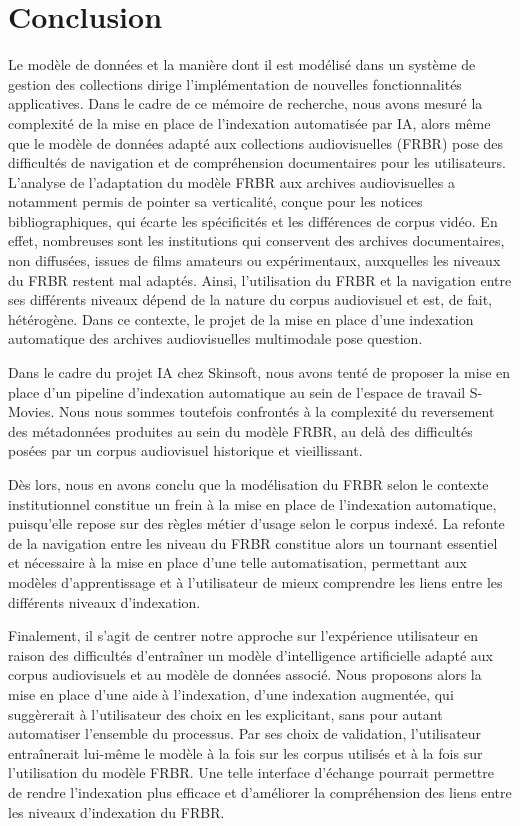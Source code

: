 \chapter*{Conclusion}

Le modèle de données et la manière dont il est modélisé dans un système de gestion des collections dirige l'implémentation de nouvelles fonctionnalités applicatives. Dans le cadre de ce mémoire de recherche, nous avons mesuré la complexité de la mise en place de l'indexation automatisée par IA, alors même que le modèle de données adapté aux collections audiovisuelles (FRBR) pose des difficultés de navigation et de compréhension documentaires pour les utilisateurs. 
L'analyse de l'adaptation du modèle FRBR aux archives audiovisuelles a notamment permis de pointer sa verticalité, conçue pour les notices bibliographiques, qui écarte les spécificités et les différences de corpus vidéo. En effet, nombreuses sont les institutions qui conservent des archives documentaires, non diffusées, issues de films amateurs ou expérimentaux, auxquelles les niveaux du FRBR restent mal adaptés. Ainsi, l'utilisation du FRBR et la navigation entre ses différents niveaux dépend de la nature du corpus audiovisuel et est, de fait, hétérogène.  Dans ce contexte, le projet de la mise en place d'une indexation automatique des archives audiovisuelles multimodale pose question.

Dans le cadre du projet IA chez Skinsoft, nous avons tenté de proposer la mise en place d'un pipeline d'indexation automatique au sein de l'espace de travail S-Movies. Nous nous sommes toutefois confrontés à la complexité du reversement des métadonnées produites au sein du modèle FRBR, au delà des difficultés posées par un corpus audiovisuel historique et vieillissant. 

Dès lors, nous en avons conclu que la modélisation du FRBR selon le contexte institutionnel constitue un frein à la mise en place de l'indexation automatique, puisqu'elle repose sur des règles métier d'usage selon le corpus indexé. La refonte de la navigation entre les niveau du FRBR constitue alors un tournant essentiel et nécessaire à la mise en place d'une telle automatisation, permettant aux modèles d'apprentissage et à l'utilisateur de mieux comprendre les liens entre les différents niveaux d'indexation. 

Finalement, il s'agit de centrer notre approche sur l'expérience utilisateur en raison des difficultés d'entraîner un modèle d'intelligence artificielle adapté aux corpus audiovisuels et au modèle de données associé. Nous proposons alors la mise en place d'une aide à l'indexation, d'une indexation augmentée, qui suggèrerait à l'utilisateur des choix en les explicitant, sans pour autant automatiser l'ensemble du processus.  Par ses choix de validation, l'utilisateur entraînerait lui-même le modèle à la fois sur les corpus utilisés et à la fois sur l'utilisation du modèle FRBR. Une telle interface d'échange pourrait permettre de rendre l'indexation plus efficace et d'améliorer la compréhension des liens entre les niveaux d'indexation du FRBR. 

